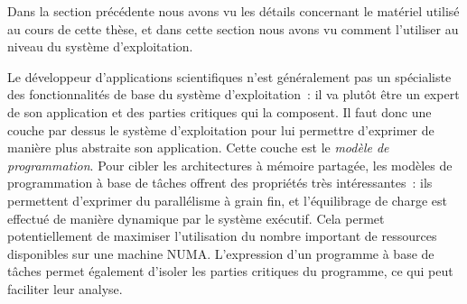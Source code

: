 Dans la section précédente nous avons vu les détails concernant le matériel utilisé au cours de cette thèse, et dans cette section nous avons vu comment l'utiliser au niveau du système d'exploitation.

Le développeur d'applications scientifiques n'est généralement pas un spécialiste des fonctionnalités de base du système d'exploitation~: il va plutôt être un expert de son application et des parties critiques qui la composent.
Il faut donc une couche par dessus le système d'exploitation pour lui permettre d'exprimer de manière plus abstraite son application. Cette couche est le \emph{modèle de programmation}.
Pour cibler les architectures à mémoire partagée, les modèles de programmation à base de tâches offrent des propriétés très intéressantes~: ils permettent d'exprimer du parallélisme à grain fin, et l'équilibrage de charge est effectué de manière dynamique par le système exécutif.
Cela permet potentiellement de maximiser l'utilisation du nombre important de ressources disponibles sur une machine NUMA.
L'expression d'un programme à base de tâches permet également d'isoler les parties critiques du programme, ce qui peut faciliter leur analyse.
